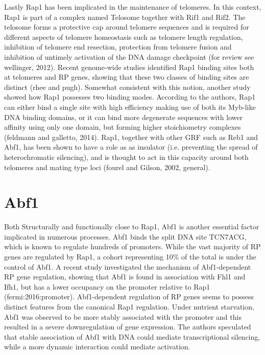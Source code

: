 Lastly Rap1 has been implicated in the maintenance of telomeres. In this context, Rap1 is part of a complex named Telosome together with Rif1 and Rif2. The telosome forms a protective cap around telomere sequences and is required for different aspects of telomere homeostasis such as telomere length regulation, inhibition of telomere end resection, protection from telomere fusion and inhibition of untimely activation of the DNA damage checkpoint (for review see wellinger, 2012). Recent genome-wide studies identified Rap1 binding sites both at telomeres and RP genes, showing that these two classes of binding sites are distinct (rhee and pugh). Somewhat consistent with this notion, another study showed how Rap1 possesses two binding modes. According to the authors, Rap1 can either bind a single site with high efficiency making use of both its Myb-like DNA binding domains, or it can bind more degenerate sequences with lower affinity using only one domain, but forming higher stoichiometry complexes (feldmann and galletto, 2014).
Rap1, together with other GRF such as Reb1 and Abf1, has been shown to have a role as as insulator (i.e. preventing the spread of heterochromatic silencing), and is thought to act in this capacity around both telomeres and mating type loci (fourel and Gilson, 2002, general).

\section{Abf1}

Both Structurally and functionally close to Rap1, Abf1 is another essential factor implicated in numerous processes. Abf1 binds the split DNA site TCN{7}ACG, which is known to regulate hundreds of promoters. 
While the vast majority of RP genes are regulated by Rap1, a cohort representing 10\% of the total is under the control of Abf1. A recent study investigated the mechanism of Abf1-dependent RP gene regulation, showing that Abf1 is found in association with Fhl1 and Ifh1, but has a lower occupancy on the promoter relative to Rap1 (fermi:2016:promoter). Abf1-dependent regulation of RP genes seems to possess distinct features from the canonical Rap1 regulation. Under nutrient starvation, Abf1 was observed to be more stably associated with the promoter and this resulted in a severe downregulation of gene expression. The authors speculated that stable association of Abf1 with DNA could mediate transcriptional silencing, while a more dynamic interaction could mediate activation.

